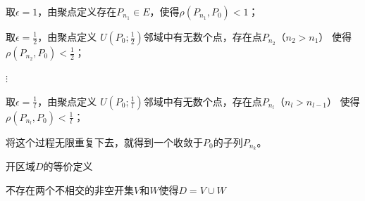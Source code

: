 \documentclass{article}
\begin{document}
取$\epsilon = 1$，由聚点定义存在$P_{n_1} \in E$，使得$\rho(P_{n_1}, P_0) < 1$；

取$\epsilon = \frac{1}{2}$，由聚点定义
$U(P_0; \frac{1}{2})$邻域中有无数个点，存在点$P_{n_2}$（$n_2 > n_1$）
使得$\rho(P_{n_2}, P_0) < \frac{1}{2}$；

$\vdots$

取$\epsilon = \frac{1}{l}$，由聚点定义
$U(P_0; \frac{1}{l})$邻域中有无数个点，存在点$P_{n_l}$（$n_l > n_{l - 1}$）
使得$\rho(P_{n_l}, P_0) < \frac{1}{l}$；

将这个过程无限重复下去，就得到一个收敛于$P_0$的子列$P_{n_k}$。

\begin{zremark}
  开区域$D$的等价定义

  不存在两个不相交的非空开集$V$和$W$使得$D = V \cup W$
\end{zremark}
\end{document}
